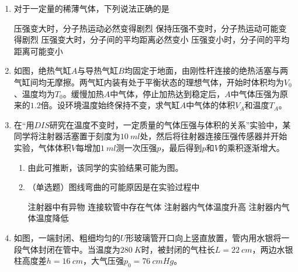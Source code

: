 \begin{enumerate}[leftmargin=0em]
\item 
{}
对于一定量的稀薄气体，下列说法正确的是  

\fourchoices
{压强变大时，分子热运动必然变得剧烈}
{保持压强不变时，分子热运动可能变得剧烈}
{压强变大时，分子间的平均距离必然变小}
{压强变小时，分子间的平均距离可能变小}


\item 
{}
如图，绝热气缸$ A $与导热气缸$ B $均固定于地面，由刚性杆连接的绝热活塞与两气缸间均无摩擦。两气缸内装有处于平衡状态的理想气体，开始时体积均为$ V_{0} $、温度均为$ T_{0} $。缓慢加热$ A $中气体，停止加热达到稳定后，$ A $中气体压强为原来的$ 1.2 $倍。设环境温度始终保持不变，求气缸$ A $中气体的体积$ V_A $和温度$ T_A $。
\begin{figure}[h!]
\flushright

\end{figure}



\item 
{}
在“用$ DIS $研究在温度不变时，一定质量的气体压强与体积的关系”实验中，某同学将注射器活塞置于刻度为$ 10\ ml $处，然后将往射器连接压强传感器并开始实验，气体体积$ V $每增加$ 1\ ml $测一次压强$ p $，最后得到$ p $和$ V $的乘积逐渐增大。
\begin{enumerate}
\renewcommand{\labelenumii}{(\arabic{enumii})}

\item 
由此可推断，该同学的实验结果可能为图。
\begin{figure}[h!]
\centering

\end{figure}

\item 
（单选题）图线弯曲的可能原因是在实验过程中  


\fourchoices
{注射器中有异物}
{连接软管中存在气体}
{注射器内气体温度升高}
{注射器内气体温度降低}


\end{enumerate}

\item 
{}
如图，一端封闭、粗细均匀的$ U $形玻璃管开口向上竖直放置，管内用水银将一段气体封闭在管中。当温度为$ 280\ K $时，被封闭的气柱长$ L=22 \ cm $，两边水银柱高度差$ h=16 \ cm $，大气压强$ p_0=76 \ cmHg $。
\begin{enumerate}
\renewcommand{\labelenumii}{(\arabic{enumii})}


\end{enumerate}
\end{enumerate}
